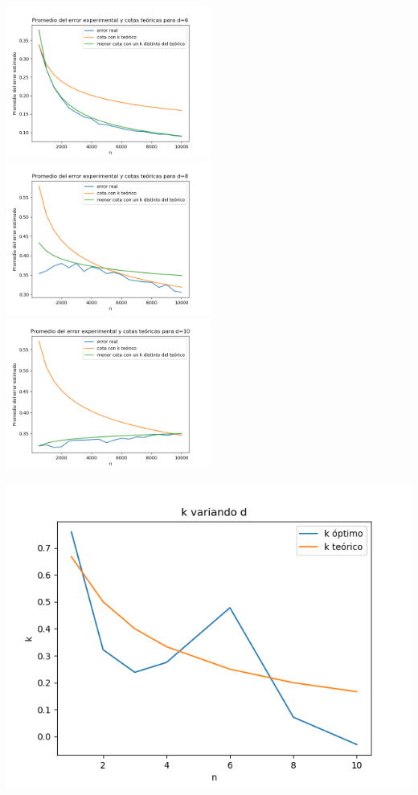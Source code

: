 \documentclass[12pt, a4paper]{article}
\begin{document}
\includegraphics[width=0.5\textwidth]{figuras_h_dinamico/cotas-error-d=6}
\includegraphics[width=0.5\textwidth]{figuras_h_dinamico/cotas-error-d=8}
\includegraphics[width=0.5\textwidth]{figuras_h_dinamico/cotas-error-d=10}

\includegraphics[width=\textwidth]{figuras_h_dinamico/k-variando-d}
\end{document}
